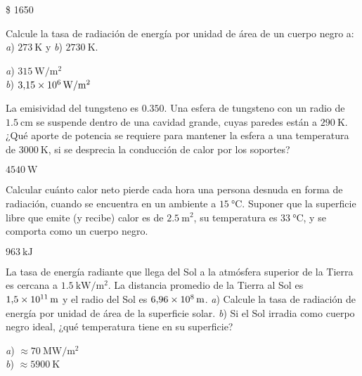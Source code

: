 \begin{Answer}
	\begin{minipage}[t]{.4\textwidth}
    \$ 1650
  \end{minipage}
\end{Answer}
%
\begin{Exercise}
  Calcule la tasa de radiación de energía por unidad de área de un cuerpo negro a: \textit{a}) $\SI{273}{\kelvin}$ y \textit{b}) $\SI{2730}{\kelvin}$.
\end{Exercise}
\begin{Answer}
	\begin{minipage}[t]{.4\textwidth}
    \textit{a}) $\SI{315}{\watt/\square\metre}$\\ \textit{b}) $\SI{3.15E6}{\watt/\square\metre}$
  \end{minipage}
\end{Answer}
%
\begin{Exercise}
  {}{}
  La emisividad del tungsteno es $0.350$. Una esfera de tungsteno con un radio de $\SI{1.5}{\centi\metre}$ se suspende dentro de una cavidad grande, cuyas paredes están a $\SI{290}{\kelvin}$. ¿Qué aporte de potencia se requiere para mantener la esfera a una temperatura de $\SI{3000}{\kelvin}$, si se desprecia la conducción de calor por los soportes?
\end{Exercise}
\begin{Answer}
  $\SI{4540}{\watt}$
\end{Answer}
%
\begin{Exercise}
  Calcular cuánto calor neto pierde cada hora una persona desnuda en forma de radiación, cuando se encuentra en un ambiente a $\SI{15}{\celsius}$. Suponer que la superficie libre que emite (y recibe) calor es de $\SI{2.5}{\metre\squared}$, su temperatura es $\SI{33}{\celsius}$, y se comporta como un cuerpo negro.
\end{Exercise}
\begin{Answer}
	\begin{minipage}[t]{.4\textwidth}
    $\SI{963}{\kilo\joule}$
  \end{minipage}
\end{Answer}
%
\begin{Exercise}
  La tasa de energía radiante que llega del Sol a la atmósfera superior de la Tierra es cercana a $\SI{1.5}{\kilo\watt/\square\metre}$. La distancia promedio de la Tierra al Sol es $\SI{1.5E11}{\metre}$ y el radio del Sol es $\SI{6.96E8}{\metre}$. \textit{a}) Calcule la tasa de radiación de energía por unidad de área de la superficie solar. \textit{b}) Si el Sol irradia como cuerpo negro ideal, ¿qué temperatura tiene en su superficie?
\end{Exercise}
\begin{Answer}
	\begin{minipage}[t]{.4\textwidth}
    \textit{a}) $\approx\SI{70}{\mega\watt/\square\metre}$\\ \textit{b}) $\approx\SI{5900}{\kelvin}$
  \end{minipage}
\end{Answer}
%